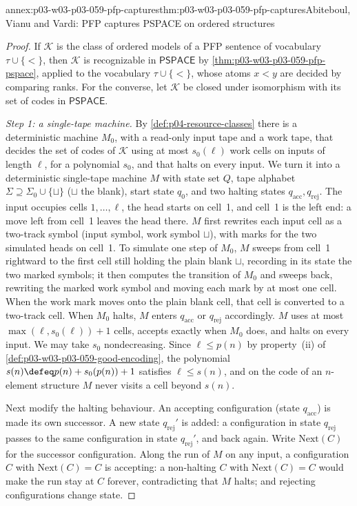 \begin{annexitem}{annex:p03-w03-p03-059-pfp-captures}{thm:p03-w03-p03-059-pfp-captures}{Abiteboul, Vianu and Vardi: PFP captures PSPACE on ordered structures}
\begin{proof}
If \(\mathcal K\) is the class of ordered models of a PFP sentence of
vocabulary \(\tau\cup\{<\}\), then \(\mathcal K\) is recognizable in
\(\mathsf{PSPACE}\) by \cref{thm:p03-w03-p03-059-pfp-pspace}, applied to
the vocabulary \(\tau\cup\{<\}\), whose atoms \(x<y\) are decided by
comparing ranks. For the converse, let \(\mathcal K\) be
closed under isomorphism with its set of codes in \(\mathsf{PSPACE}\).

\emph{Step 1: a single-tape machine.} By \cref{def:p04-resource-classes}
there is a deterministic machine \(M_0\), with a read-only input tape and a
work tape, that decides the set of codes of \(\mathcal K\) using at most
\(s_0(\ell)\) work cells on inputs of length \(\ell\), for a polynomial
\(s_0\), and that halts on every input. We turn it into a deterministic
single-tape machine \(M\) with state set \(Q\), tape alphabet
\(\Sigma\supseteq\Sigma_0\cup\{\sqcup\}\) (\(\sqcup\) the blank), start
state \(q_0\), and two halting states \(q_{\mathrm{acc}},q_{\mathrm{rej}}\).
The input occupies cells \(1,\ldots,\ell\), the head starts on cell~1, and
cell~1 is the left end: a move left from cell~1 leaves the head there.
\(M\) first rewrites each input cell as a two-track symbol (input symbol,
work symbol \(\sqcup\)), with marks for the two simulated heads on cell~1.
To simulate one step of \(M_0\), \(M\) sweeps from cell~1 rightward to the
first cell still holding the plain blank \(\sqcup\), recording in its
state the two marked symbols; it then computes the transition of \(M_0\)
and sweeps back, rewriting the marked work symbol and moving each mark by
at most one cell. When the work mark moves onto the plain blank cell, that
cell is converted to a two-track cell. When \(M_0\) halts, \(M\) enters
\(q_{\mathrm{acc}}\) or \(q_{\mathrm{rej}}\) accordingly. \(M\) uses at
most \(\max(\ell,s_0(\ell))+1\) cells, accepts exactly when \(M_0\) does,
and halts on every input. We may take \(s_0\) nondecreasing. Since \(\ell\leq p(n)\) by
property~(ii) of \cref{def:p03-w03-p03-059-good-encoding}, the polynomial
\(s(n)\defeq p(n)+s_0(p(n))+1\) satisfies \(\ell\leq s(n)\), and on the
code of an \(n\)-element structure \(M\) never visits a cell beyond
\(s(n)\).

Next modify the halting behaviour. An accepting configuration (state
\(q_{\mathrm{acc}}\)) is made its own successor. A new state
\(q_{\mathrm{rej}}'\) is added: a configuration in state
\(q_{\mathrm{rej}}\) passes to the same configuration in state
\(q_{\mathrm{rej}}'\), and back again. Write \(\mathrm{Next}(C)\) for the
successor configuration. Along the run of \(M\) on any input, a
configuration \(C\) with \(\mathrm{Next}(C)=C\) is accepting: a
non-halting \(C\) with \(\mathrm{Next}(C)=C\) would make the run stay at
\(C\) forever, contradicting that \(M\) halts; and rejecting configurations
change state.


\end{proof}
\end{annexitem}
